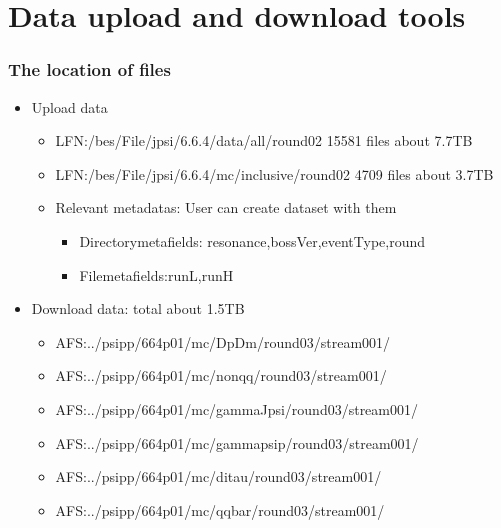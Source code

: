 \documentclass{beamer}
\begin{document}
\section{Data upload and download tools}
\begin{frame}
  \frametitle{The location of files}
  \begin{itemize}
    \item Upload data
      \begin{itemize}
          \item LFN:/bes/File/jpsi/6.6.4/data/all/round02   15581 files   about 7.7TB
          \item LFN:/bes/File/jpsi/6.6.4/mc/inclusive/round02 4709 files  about 3.7TB
          \item Relevant metadatas: User can create dataset with them
            \begin{itemize}
              \item Directorymetafields: resonance,bossVer,eventType,round
              \item Filemetafields:runL,runH
            \end{itemize}
      \end{itemize}
    \item Download data: total about 1.5TB
      \begin{itemize}
          \item AFS:../psipp/664p01/mc/DpDm/round03/stream001/
          \item AFS:../psipp/664p01/mc/nonqq/round03/stream001/
          \item AFS:../psipp/664p01/mc/gammaJpsi/round03/stream001/
          \item AFS:../psipp/664p01/mc/gammapsip/round03/stream001/
          \item AFS:../psipp/664p01/mc/ditau/round03/stream001/
          \item AFS:../psipp/664p01/mc/qqbar/round03/stream001/
      \end{itemize}
  \end{itemize}
\end{frame}
\end{document}
